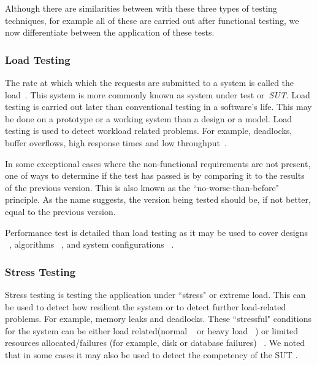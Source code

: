 Although there are similarities between with these three types of testing techniques, for example all of these are carried out after functional testing, we now differentiate between the application of these tests.

\subsubsection{Load Testing}

The rate at which which the requests are submitted to a system is called the load~\cite{Beizer:1984}. This system is more commonly known as system under test or~\textit{SUT}. Load testing is carried out later than conventional testing in a software's life. This may be done on a prototype or a working system than a design or a model. Load testing is used to detect workload related problems. For example, deadlocks, buffer overflows, high response times and low throughput~\cite{464549,Barna:2011,6032540}. 

In some exceptional cases where the non-functional requirements are not present, one of ways to determine if the test has passed is by comparing it to the results of the previous version. This is also known as the ``no-worse-than-before" principle. As the name suggests, the version being tested should be, if not better, equal to the previous version.~\cite{Dumke:2001}

Performance test is detailed than load testing as it may be used to cover designs ~\cite{csurgay1999performance,denaro2004early,denaro2005performance}, algorithms ~\cite{cangussu2009segment,cangussu2007reducing}, and system configurations ~\cite{hoskins2005software,pozin2011models,sopitkamol2005method}. 

\subsubsection{Stress Testing}

Stress testing is testing the application under ``stress" or extreme load. This can be used to detect how resilient the system or to detect further load-related problems. For example, memory leaks and deadlocks. These ``stressful" conditions for the system can be either load related(normal ~\cite{zhang2002automated,kalita2011investigation,chakravarty2010stress} or heavy load ~\cite{Dillenseger2009,kalita2011investigation,huebner2001performance}) or limited resources allocated/failures (for example, disk or database failures) ~\cite{acharya2009mining}. We noted that in some cases it may also be used to detect the competency of the SUT \cite{garousi2010genetic,garousi2008empirical,garousi2006traffic,garousi2008traffic}.


